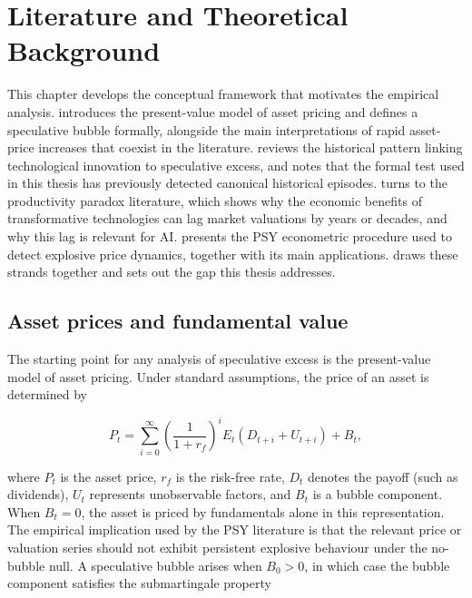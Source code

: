 \chapter{Literature and Theoretical Background}
\label{ch:literature}

This chapter develops the conceptual framework that motivates the empirical analysis.  introduces the present-value model of asset pricing and defines a speculative bubble formally, alongside the main interpretations of rapid asset-price increases that coexist in the literature.  reviews the historical pattern linking technological innovation to speculative excess, and notes that the formal test used in this thesis has previously detected canonical historical episodes.  turns to the productivity paradox literature, which shows why the economic benefits of transformative technologies can lag market valuations by years or decades, and why this lag is relevant for AI.  presents the PSY econometric procedure used to detect explosive price dynamics, together with its main applications.  draws these strands together and sets out the gap this thesis addresses.

\section{Asset prices and fundamental value}
\label{sec:asset-prices-fundamental-value}

The starting point for any analysis of speculative excess is the present-value model of asset pricing. Under standard assumptions, the price of an asset is determined by

\begin{equation}
P_t = \sum_{i=0}^{\infty} \left( \frac{1}{1+r_f} \right)^i E_t \left( D_{t+i} + U_{t+i} \right) + B_t,
\label{eq:present-value-bubble}
\end{equation}

\noindent where $P_t$ is the asset price, $r_f$ is the risk-free rate, $D_t$ denotes the payoff (such as dividends), $U_t$ represents unobservable factors, and $B_t$ is a bubble component. When $B_t = 0$, the asset is priced by fundamentals alone in this representation. The empirical implication used by the PSY literature is that the relevant price or valuation series should not exhibit persistent explosive behaviour under the no-bubble null. A speculative bubble arises when $B_0 > 0$, in which case the bubble component satisfies the submartingale property

